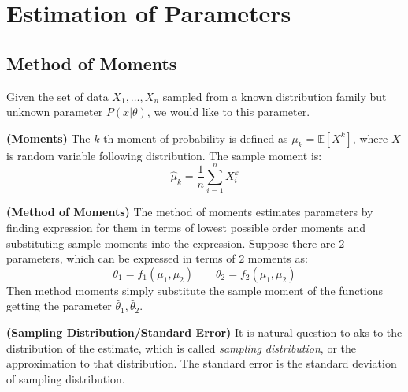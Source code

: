 \section{Estimation of Parameters}

\subsection{Method of Moments}

\begin{remark}
    Given the set of data $X_1,\dots,X_n$ sampled from a known distribution family but unknown parameter $P(x|\theta)$, we would like to this parameter.
\end{remark}

\begin{definition}{\textbf{(Moments)}}
    The $k$-th moment of probability is defined as $\mu_k = \mathbb{E}[X^k]$, where $X$ is random variable following distribution. The sample moment is:
    \begin{equation*}
        \hat{\mu}_k = \frac{1}{n}\sum^n_{i=1}X^k_i
    \end{equation*}
\end{definition}

\begin{definition}{\textbf{(Method of Moments)}}
    The method of moments estimates parameters by finding expression for them in terms of lowest possible order moments and substituting sample moments into the expression. Suppose there are $2$ parameters, which can be expressed in terms of $2$ moments as:
    \begin{equation*}
        \theta_1 = f_1(\mu_1,\mu_2)\qquad \theta_2=f_2(\mu_1,\mu_2)
    \end{equation*}
    Then method moments simply substitute the sample moment of the functions getting the parameter $\hat{\theta}_1, \hat{\theta}_2$.
\end{definition}

\begin{definition}{\textbf{(Sampling Distribution/Standard Error)}}
    It is natural question to aks to the distribution of the estimate, which is called \emph{sampling distribution}, or the approximation to that distribution. The standard error is the standard deviation of sampling distribution. 
\end{definition}

